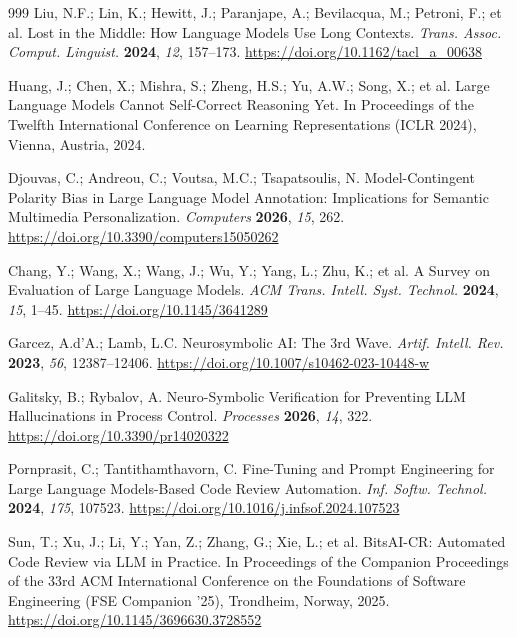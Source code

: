 \documentclass[computers,article,submit,moreauthors]{Definitions/mdpi}
\begin{document}
{\begin{thebibliography}{999}
Liu, N.F.; Lin, K.; Hewitt, J.; Paranjape, A.; Bevilacqua, M.; Petroni, F.; et al. Lost in the Middle: How Language Models Use Long Contexts. {\em Trans. Assoc. Comput. Linguist.} {\bf 2024}, {\em 12}, 157--173. \url{https://doi.org/10.1162/tacl\_a\_00638}

Huang, J.; Chen, X.; Mishra, S.; Zheng, H.S.; Yu, A.W.; Song, X.; et al. Large Language Models Cannot Self-Correct Reasoning Yet. In Proceedings of the Twelfth International Conference on Learning Representations (ICLR 2024), Vienna, Austria, 2024.

Djouvas, C.; Andreou, C.; Voutsa, M.C.; Tsapatsoulis, N. Model-Contingent Polarity Bias in Large Language Model Annotation: Implications for Semantic Multimedia Personalization. {\em Computers} {\bf 2026}, {\em 15}, 262. \url{https://doi.org/10.3390/computers15050262}

Chang, Y.; Wang, X.; Wang, J.; Wu, Y.; Yang, L.; Zhu, K.; et al. A Survey on Evaluation of Large Language Models. {\em ACM Trans. Intell. Syst. Technol.} {\bf 2024}, {\em 15}, 1--45. \url{https://doi.org/10.1145/3641289}

Garcez, A.d'A.; Lamb, L.C. Neurosymbolic AI: The 3rd Wave. {\em Artif. Intell. Rev.} {\bf 2023}, {\em 56}, 12387--12406. \url{https://doi.org/10.1007/s10462-023-10448-w}

Galitsky, B.; Rybalov, A. Neuro-Symbolic Verification for Preventing LLM Hallucinations in Process Control. {\em Processes} {\bf 2026}, {\em 14}, 322. \url{https://doi.org/10.3390/pr14020322}

Pornprasit, C.; Tantithamthavorn, C. Fine-Tuning and Prompt Engineering for Large Language Models-Based Code Review Automation. {\em Inf. Softw. Technol.} {\bf 2024}, {\em 175}, 107523. \url{https://doi.org/10.1016/j.infsof.2024.107523}

Sun, T.; Xu, J.; Li, Y.; Yan, Z.; Zhang, G.; Xie, L.; et al. BitsAI-CR: Automated Code Review via LLM in Practice. In Proceedings of the Companion Proceedings of the 33rd ACM International Conference on the Foundations of Software Engineering (FSE Companion '25), Trondheim, Norway, 2025. \url{https://doi.org/10.1145/3696630.3728552}


\end{thebibliography}}
\end{document}
